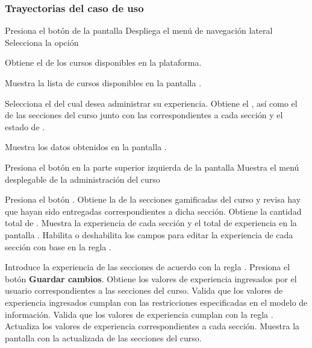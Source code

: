 \subsubsection{Trayectorias del caso de uso}

\begin{UCtrayectoria}%
%
  \Actor Presiona el botón \IUMenu de la pantalla 
  \Sistema Despliega el menú de navegación lateral
  \Actor Selecciona la opción 

  \Sistema Obtiene el  de los cursos disponibles en la
           plataforma.

  \Sistema Muestra la lista de cursos disponibles en la pantalla .

  \Actor Selecciona el  del cual desea administrar su experiencia.
  \Sistema Obtiene el , 
           así como el  de las secciones
           del curso junto con las 
           correspondientes a cada sección y el estado de .

  \Sistema Muestra los datos obtenidos en la pantalla .
           \label{CU-E07-pantalla}

  \Actor Presiona el botón \IUAdminSitio en la parte superior izquierda de la pantalla
  \Sistema Muestra el menú desplegable de la administración del curso

  \Actor Presiona el botón . 
  \Sistema Obtiene la  de la secciones gamificadas del
           curso y revisa hay  que hayan sido
           entregadas correspondientes a dicha sección.
  \Sistema Obtiene la cantidad total de .
  \Sistema Muestra la experiencia de cada sección y el total de experiencia
           en la pantalla .
  \Sistema Habilita o deshabilita los campos para editar la experiencia de cada
           sección con base en la regla .

  \Actor Introduce la experiencia de las secciones de acuerdo con la regla
         . 
  \Actor Presiona el botón {\bf Guardar cambios}.  \label{CU-E07-submit}
  \Sistema Obtiene los valores de experiencia ingresados por el usuario
           correspondientes a las secciones del curso.
  \Sistema Valida que los valores de experiencia ingresados cumplan con las
           restricciones especificadas en el modelo de información. 
  \Sistema Valida que los valores de experiencia cumplan con la regla
            .
  \Sistema Actualiza los valores de experiencia correspondientes a cada sección.
           \label{CU-E07-finish}
  \Sistema Muestra la pantalla  con la 
           actualizada de las secciones del curso.


\end{UCtrayectoria}

